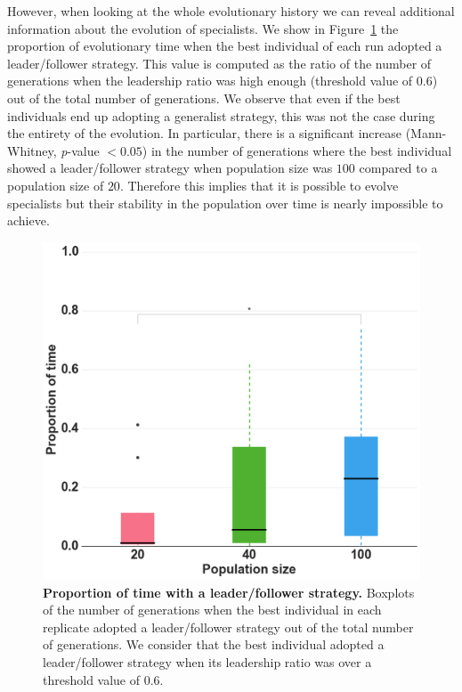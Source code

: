      However, when looking at the whole evolutionary history we can reveal additional information about the evolution of specialists. We show in Figure~\ref{fig:leadershipTime} the proportion of evolutionary time when the best individual of each run adopted a leader/follower strategy. This value is computed as the ratio of the number of generations when the leadership ratio was high enough (threshold value of $0.6$) out of the total number of generations. We observe that even if the best individuals end up adopting a generalist strategy, this was not the case during the entirety of the evolution. In particular, there is a significant increase (Mann-Whitney, {\em p}-value $< 0.05$) in the number of generations where the best individual showed a leader/follower strategy when population size was $100$ compared to a population size of $20$. Therefore this implies that it is possible to evolve specialists but their stability in the population over time is nearly impossible to achieve.

      \begin{figure}[hbtp]
        \centering
          \includegraphics[scale=0.25]{fig/ArticleRob2/boxplotLeadershipTime.png}
          \caption{\textbf{Proportion of time with a leader/follower strategy.} Boxplots of the number of generations when the best individual in each replicate adopted a leader/follower strategy out of the total number of generations. We consider that the best individual adopted a leader/follower strategy when its leadership ratio was over a threshold value of $0.6$.}
        \label{fig:leadershipTime}
      \end{figure}


